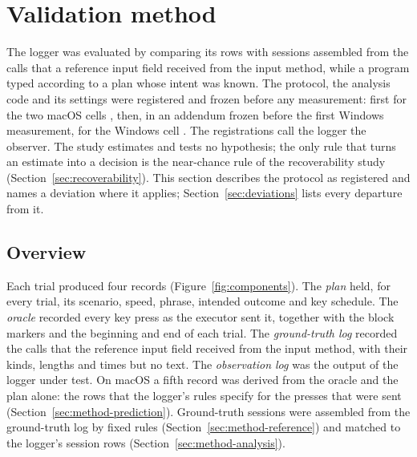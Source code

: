 
\section{Validation method}
\label{sec:method}

The logger was evaluated by comparing its rows with sessions assembled from the calls that a reference input field
received from the input method, while a program typed according to a plan whose intent was known. The protocol, the
analysis code and its settings were registered and frozen before any measurement: first for the two macOS cells
\citep{prereg-macos}, then, in an addendum frozen before the first Windows measurement, for the Windows cell
\citep{prereg-windows}. The registrations call the logger the observer. The study estimates and tests no hypothesis;
the only rule that turns an estimate into a decision is the near-chance rule of the recoverability study
(Section~\ref{sec:recoverability}). This section describes the protocol as registered and names a deviation where it
applies; Section~\ref{sec:deviations} lists every departure from it.

\subsection{Overview}
\label{sec:method-overview}

Each trial produced four records (Figure~\ref{fig:components}). The \emph{plan} held, for every trial, its scenario,
speed, phrase, intended outcome and key schedule. The \emph{oracle} recorded every key press as the executor sent it,
together with the block markers and the beginning and end of each trial. The \emph{ground-truth log} recorded the
calls that the reference input field received from the input method, with their kinds, lengths and times but no
text. The \emph{observation log} was the output of the logger under test. On macOS a fifth record was derived from
the oracle and the plan alone: the rows that the logger's rules specify for the presses that were sent
(Section~\ref{sec:method-prediction}). Ground-truth sessions were assembled from the ground-truth log by fixed rules
(Section~\ref{sec:method-reference}) and matched to the logger's session rows (Section~\ref{sec:method-analysis}).

